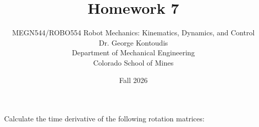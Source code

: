 \documentclass[12pt]{article}
\newenvironment{problem}[2][Problem]{\begin{trivlist}
\item[\hskip \labelsep {\bfseries #1}\hskip \labelsep {\bfseries #2.}]}{\end{trivlist}}
\begin{document}
 
 
\title{Homework 7}
\author{MEGN544/ROBO554 Robot Mechanics: Kinematics, Dynamics, and Control  
\\ 
Dr. George Kontoudis\\
Department of Mechanical Engineering\\
Colorado School of Mines}
\date{Fall 2026}
 
\maketitle
\begin{problem}{1}%
Calculate the time derivative of the following rotation matrices:
\end{problem}
\end{document}
